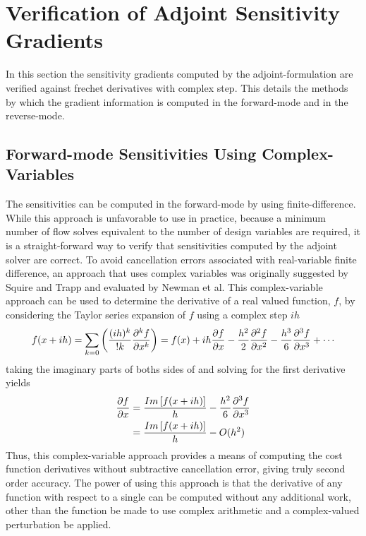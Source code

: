 \chapter{Verification of Adjoint Sensitivity Gradients}
\label{chapter-six}

In this section the sensitivity gradients computed by the adjoint-formulation
are verified against frechet derivatives with complex step.  This details the
methods by which the gradient information is computed in the forward-mode and in
the reverse-mode.

\section{Forward-mode Sensitivities Using Complex-Variables}

The sensitivities can be computed in the forward-mode by using
finite-difference.  While this approach is unfavorable to use in practice,
because a minimum number of flow solves equivalent to the number of design
variables are required, it is a straight-forward way to verify that
sensitivities computed by the adjoint solver are correct.  To avoid cancellation
errors associated with real-variable finite difference, an approach that uses
complex variables was originally suggested by Squire and Trapp\cite{squire1998}
and evaluated by Newman et al\cite{newman1998}.  This complex-variable approach
can be used to determine the derivative of a real valued function, $f$, by
considering the Taylor series expansion of $f$ using a complex step $ih$
\begin{equation}
  f(x + ih) = \sum_{k=0}\left( \frac{(ih)^k}{!k}\pnd{f}{x}{k} \right)
            = f(x) + ih\pd{f}{x} - \frac{h^2}{2}\pnd{f}{x}{2}
            - \frac{h^3}{6}\pnd{f}{x}{3} + \cdots
  \label{taylor-exp}
\end{equation}
taking the imaginary parts of boths sides of  and solving for
the first derivative yields
\begin{equation}
  \begin{aligned}
    \frac{\partial f}{\partial x} &= \frac{Im\left[ f(x + ih) \right]}{h} -
    \frac{h^2}{6}\frac{\partial^{3} f}{\partial x^{3}} \\
              &= \frac{Im\left[ f(x + ih) \right]}{h} - O(h^2)
  \end{aligned}
  \label{complex-fd}
\end{equation}
Thus, this complex-variable approach provides a means of computing the cost
function derivatives without subtractive cancellation error, giving truly second
order accuracy.  The power of using this approach is that the derivative of any
function with respect to a single can be computed without any additional work,
other than the function be made to use complex arithmetic and a complex-valued
perturbation be applied.

